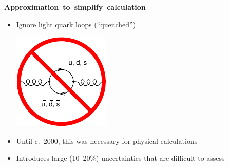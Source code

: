\documentclass[landscape]{article}
\newenvironment{slide}[1][ ]{\mbox{\bf \boldmath #1 } \vfill}{\vfill \vspace{-1.5 cm} \mbox{ } \pagebreak}
\newenvironment{itemizer}[1]{\begin{itemize}\setlength{\itemsep}{#1}}{\end{itemize}}
\begin{document}
\begin{slide}[Approximation to simplify calculation]

\begin{itemizer}{2 cm}

  \item \begin{minipage}{0.6\linewidth} Ignore light quark loops (``quenched'') \end{minipage} \hfill \begin{minipage}{7 cm} \includegraphics[width=\linewidth]{quenched} \end{minipage}

  \item Until c.\ 2000, this was necessary for physical calculations

  \item Introduces large (10--20\%) uncertainties that are difficult to assess

\end{itemizer}

\end{slide}
\end{document}
